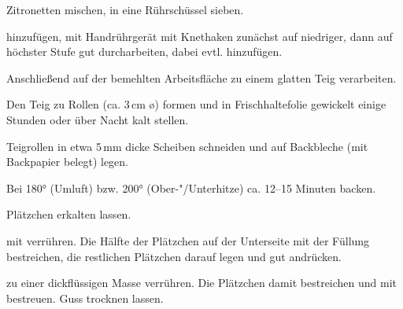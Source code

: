 \begin{recipe}{Zitronetten}
  mischen, in eine Rührschüssel sieben.

  hinzufügen, mit Handrührgerät mit Knethaken zunächst auf niedriger,
  dann auf höchster Stufe gut durcharbeiten, dabei evtl.
  hinzufügen.

  Anschließend auf der bemehlten Arbeitsfläche zu einem glatten Teig
  verarbeiten.

  Den Teig zu Rollen (ca. 3\,cm \o) formen und in Frischhaltefolie gewickelt
  einige Stunden oder über Nacht kalt stellen.

  Teigrollen in etwa 5\,mm dicke Scheiben schneiden und auf Backbleche
  (mit Backpapier belegt) legen.

  Bei 180° (Umluft) bzw. 200° (Ober-"/Unterhitze) ca. 12--15 Minuten backen.

  Plätzchen erkalten lassen.

   mit
  verrühren.
  Die Hälfte der Plätzchen auf der Unterseite mit der Füllung bestreichen,
  die restlichen Plätzchen darauf legen und gut andrücken.

  zu einer dickflüssigen Masse verrühren.
  Die Plätzchen damit bestreichen und mit
  bestreuen. Guss trocknen lassen.
\end{recipe}
